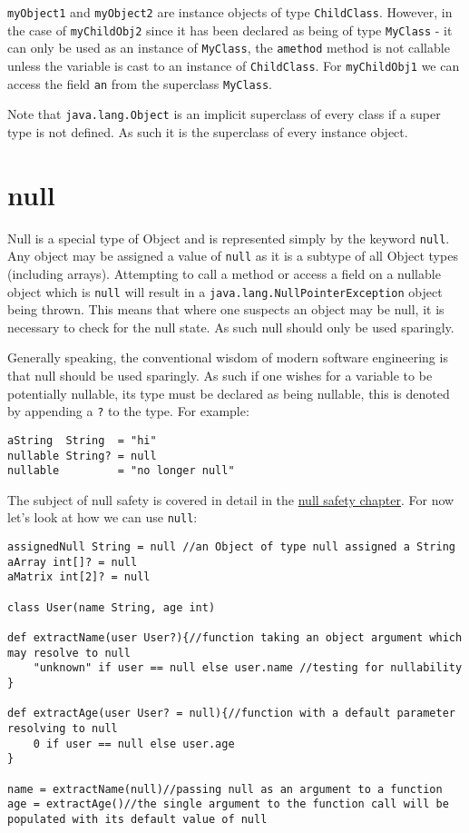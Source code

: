 \documentclass[conc-doc]{subfiles}
\begin{document}
\lstinline{myObject1} and \lstinline{myObject2} are instance objects of type \lstinline{ChildClass}. However, in the case of \lstinline{myChildObj2} since it has been declared as being of type \lstinline{MyClass} - it can only be used as an instance of \lstinline{MyClass}, the \lstinline{amethod} method is not callable unless the variable is cast to an instance of \lstinline{ChildClass}. For \lstinline{myChildObj1} we can access the field \lstinline{an} from the superclass \lstinline{MyClass}.

Note that \lstinline{java.lang.Object} is an implicit superclass of every class if a super type is not defined. As such it is the superclass of every instance object.

\section{null}
Null is a special type of Object and is represented simply by the keyword \lstinline{null}. Any object may be assigned a value of \lstinline{null} as it is a subtype of all Object types (including arrays). Attempting to call a method or access a field on a nullable object which is \lstinline{null} will result in a \lstinline{java.lang.NullPointerException} object being thrown. This means that where one suspects an object may be null, it is necessary to check for the null state. As such null should only be used sparingly.

Generally speaking, the conventional wisdom of modern software engineering is that null should be used sparingly. As such if one wishes for a variable to be potentially nullable, its type must be declared as being nullable, this is denoted by appending a \lstinline{?} to the type. For example:

\begin{lstlisting}
aString  String  = "hi"
nullable String? = null
nullable         = "no longer null"
\end{lstlisting}

The subject of null safety is covered in detail in the \hyperref[ch:nullsafe]{null safety chapter}. For now let's look at how we can use \lstinline{null}:

\begin{lstlisting}
assignedNull String = null //an Object of type null assigned a String
aArray int[]? = null
aMatrix int[2]? = null

class User(name String, age int)

def extractName(user User?){//function taking an object argument which may resolve to null
	"unknown" if user == null else user.name //testing for nullability
}

def extractAge(user User? = null){//function with a default parameter resolving to null
	0 if user == null else user.age
}

name = extractName(null)//passing null as an argument to a function
age = extractAge()//the single argument to the function call will be populated with its default value of null
\end{lstlisting}
\end{document}
